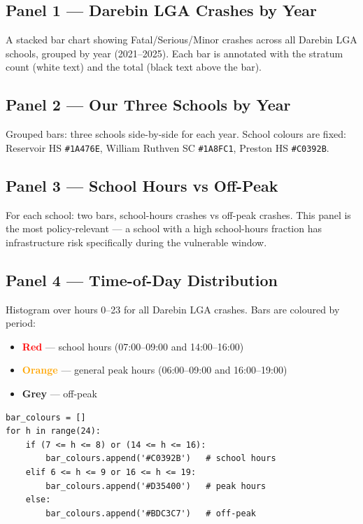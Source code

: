 \documentclass[11pt,a4paper,openany]{book}
\begin{document}
\subsection{Panel 1 --- Darebin LGA Crashes by Year}

A stacked bar chart showing Fatal/Serious/Minor crashes across all Darebin LGA schools,
grouped by year (2021--2025). Each bar is annotated with the stratum count (white text)
and the total (black text above the bar).

\subsection{Panel 2 --- Our Three Schools by Year}

Grouped bars: three schools side-by-side for each year. School colours are fixed:
Reservoir HS \texttt{\#1A476E}, William Ruthven SC \texttt{\#1A8FC1}, Preston HS \texttt{\#C0392B}.

\subsection{Panel 3 --- School Hours vs Off-Peak}

For each school: two bars, school-hours crashes vs off-peak crashes.
This panel is the most policy-relevant --- a school with a high school-hours fraction
has infrastructure risk specifically during the vulnerable window.

\subsection{Panel 4 --- Time-of-Day Distribution}

Histogram over hours 0--23 for all Darebin LGA crashes.
Bars are coloured by period:

\begin{itemize}
  \item \textcolor{red}{\textbf{Red}} --- school hours (07:00--09:00 and 14:00--16:00)
  \item \textcolor{orange}{\textbf{Orange}} --- general peak hours (06:00--09:00 and 16:00--19:00)
  \item \textcolor{codegray}{\textbf{Grey}} --- off-peak
\end{itemize}

\begin{lstlisting}[style=python, caption={Colour assignment for time-of-day histogram.}]
bar_colours = []
for h in range(24):
    if (7 <= h <= 8) or (14 <= h <= 16):
        bar_colours.append('#C0392B')   # school hours
    elif 6 <= h <= 9 or 16 <= h <= 19:
        bar_colours.append('#D35400')   # peak hours
    else:
        bar_colours.append('#BDC3C7')   # off-peak
\end{lstlisting}
\end{document}
